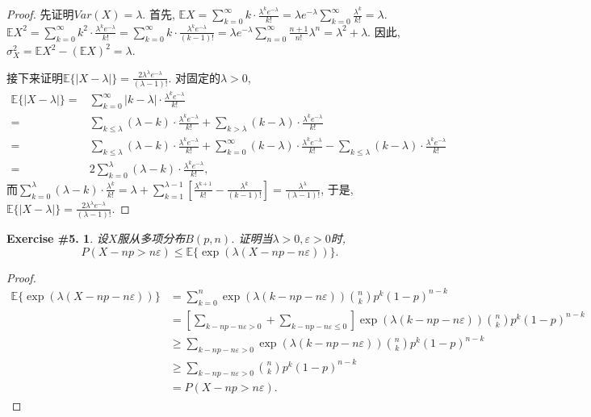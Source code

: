 \documentclass[UTF8, a4paper]{article}
\newtheorem{exercise}{Exercise \#5.}
\begin{document}
\begin{proof}
先证明\(Var(X) = \lambda\). 首先, \(\mathbb{E}X = \sum_{k=0}^{\infty} k\cdot \frac{\lambda^k e^{-\lambda}}{k!} = \lambda e^{-\lambda} \sum_{k=0}^{\infty} \frac{\lambda^k}{k!} = \lambda\).
\(\mathbb{E}X^2 = \sum_{k=0}^{\infty} k^2 \cdot \frac{\lambda^k e^{-\lambda}}{k!} = \sum_{k=0}^{\infty} k\cdot \frac{\lambda^k e^{-\lambda}}{(k-1)!} = \lambda e^{-\lambda} \sum_{n=0}^{\infty}\frac{n+1}{n!}\lambda^n = \lambda^2 + \lambda\).
因此, \(\sigma_X^2 = \mathbb{E}X^2 - \left(\mathbb{E}X\right)^2 = \lambda\).


接下来证明\(\mathbb{E}\{|X - \lambda|\} = \frac{2\lambda^\lambda e^{-\lambda}}{(\lambda - 1)!}\). 对固定的\(\lambda > 0\), 
$$
\begin{aligned}
    \mathbb{E}\{|X - \lambda|\} = &\sum_{k=0}^{\infty} |k - \lambda| \cdot \frac{\lambda^k e^{-\lambda}}{k!} \\
    =& \sum_{k \leq \lambda} (\lambda - k) \cdot \frac{\lambda^k e^{-\lambda}}{k!} + \sum_{k > \lambda} (k - \lambda) \cdot \frac{\lambda^k e^{-\lambda}}{k!} \\
    =& \sum_{k \leq \lambda} (\lambda - k) \cdot \frac{\lambda^k e^{-\lambda}}{k!} + \sum_{k=0}^\infty  (k - \lambda) \cdot \frac{\lambda^k e^{-\lambda}}{k!} -\sum_{k \leq \lambda} (k - \lambda) \cdot \frac{\lambda^k e^{-\lambda}}{k!} \\
    =& 2\sum_{k =0}^\lambda (\lambda - k) \cdot \frac{\lambda^k e^{-\lambda}}{k!},
\end{aligned}
$$
而\(\sum_{k=0}^{\lambda}(\lambda - k)\cdot \frac{\lambda^k}{k!} = \lambda + \sum_{k=1}^{\lambda-1}\left[\frac{\lambda^{k+1}}{k!} - \frac{\lambda^k}{(k-1)!}\right] = \frac{\lambda^\lambda}{(\lambda-1)!}\), 
于是, \(\mathbb{E}\{|X - \lambda|\} = \frac{2\lambda^\lambda e^{-\lambda}}{(\lambda - 1)!}\).
\end{proof}



\begin{framed}
\begin{exercise}
设\(X\)服从多项分布\(B(p,n)\). 证明当\(\lambda > 0, \varepsilon>0\)时, 
$$
P(X-n p>n \varepsilon) \leq \mathbb{E}\{\exp (\lambda(X-n p-n \varepsilon))\}.
$$
\end{exercise}
\end{framed}


\begin{proof}
$$
\begin{aligned}
    \mathbb{E}\{\exp (\lambda(X-n p-n \varepsilon))\} &= \sum_{k=0}^{n} \exp(\lambda(k-np-n\varepsilon))\binom{n}{k}p^k(1-p)^{n-k} \\
    & = \left[\sum_{k - np - n\varepsilon > 0}^{} + \sum_{k - np - n\varepsilon \leq 0}^{}\right] \exp(\lambda(k-np-n\varepsilon))\binom{n}{k}p^k(1-p)^{n-k} \\
    & \geq \sum_{k - np - n\varepsilon > 0}^{} \exp(\lambda(k-np-n\varepsilon))\binom{n}{k}p^k(1-p)^{n-k}  \\
    & \geq \sum_{k - np - n\varepsilon > 0}^{} \binom{n}{k}p^k(1-p)^{n-k}  \\
    & = P(X-np > n\varepsilon).
\end{aligned}
$$
\end{proof}
\end{document}

